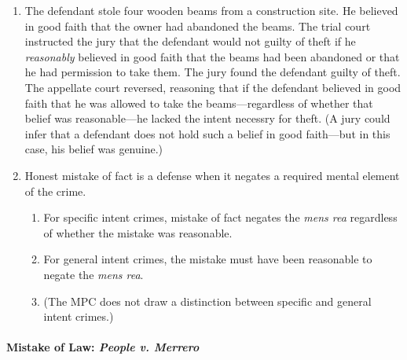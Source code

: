 \begin{enumerate}
    \item The defendant stole four wooden beams from a construction site. He believed in good faith that the owner had abandoned the beams. The trial court instructed the jury that the defendant would not guilty of theft if he \emph{reasonably} believed in good faith that the beams had been abandoned or that he had permission to take them. The jury found the defendant guilty of theft. The appellate court reversed, reasoning that if the defendant believed in good faith that he was allowed to take the beams---regardless of whether that belief was reasonable---he lacked the intent necessry for theft. (A jury could infer that a defendant does not hold such a belief in good faith---but in this case, his belief was genuine.)
    \item Honest mistake of fact is a defense when it negates a required mental element of the crime.
    \begin{enumerate}
        \item For specific intent crimes, mistake of fact negates the \emph{mens rea} regardless of whether the mistake was reasonable.
        \item For general intent crimes, the mistake must have been reasonable to negate the \emph{mens rea}.
        \item (The MPC does not draw a distinction between specific and general intent crimes.)
    \end{enumerate}
\end{enumerate}

\paragraph{Mistake of Law: \emph{People v. Merrero}}

